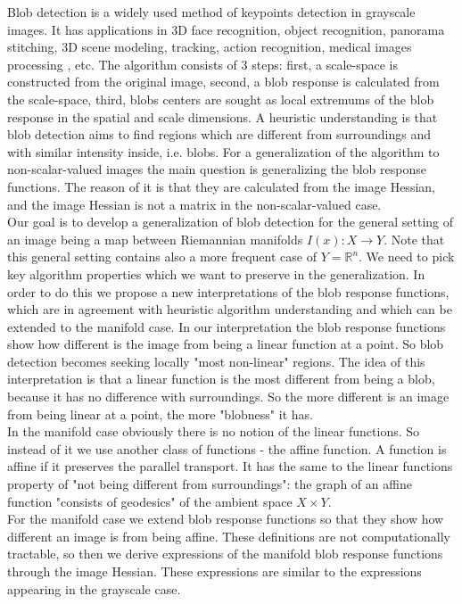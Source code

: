 \documentclass[twocolumn]{svjour3}          %
\newcommand{\Rn}{{\mathbb{R}}^n}
\begin{document}
Blob detection \cite{blob} is a widely used method of keypoints detection in grayscale images. It has applications in 3D face recognition, object recognition, panorama stitching, 3D scene modeling, tracking, action recognition, medical images processing \cite{GenLapl, GenLaplNucl, VesselEnh, CHEF}, etc. The algorithm consists of 3 steps: first, a scale-space is constructed from the original image, second, a blob response is calculated from the scale-space, third, blobs centers are sought as local extremums of the blob response in the spatial and scale dimensions. A heuristic understanding is that blob detection aims to find regions which are different from surroundings and with similar intensity inside, i.e. blobs. For a generalization of the algorithm to non-scalar-valued images the main question is generalizing the blob response functions. The reason of it is that they are calculated from the image Hessian, and the image Hessian is not a matrix in the non-scalar-valued case.
\\
Our goal is to develop a generalization of blob detection for the general setting of an image being a map between Riemannian manifolds $I(x):X \to Y$. Note that this general setting contains also a more frequent case of $Y = \Rn $. We need to pick key algorithm properties which we want to preserve in the generalization. In order to do this we propose a new interpretations of the blob response functions, which are in agreement with heuristic algorithm understanding and which can be extended to the manifold case. In our interpretation the blob response functions show how different is the image from being a linear function at a point. So blob detection becomes seeking locally "most non-linear" regions. The idea of this interpretation is that a linear function is the most different from being a blob, because it has no difference with surroundings. So the more different is an image from being linear at a point, the more "blobness" it has.
\\
In the manifold case obviously there is no notion of the linear functions. So instead of it we use another class of functions - the affine function. A function is affine if it preserves the parallel transport. It has the same to the linear functions property of "not being different from surroundings": the graph of an affine function "consists of geodesics" of the ambient space $X \times Y$.
\\
For the manifold case we extend blob response functions so that they show how different an image is from being affine. These definitions are not computationally tractable, so then we derive expressions of the manifold blob response functions through the image Hessian. These expressions are similar to the expressions appearing in the grayscale case.
\end{document}
